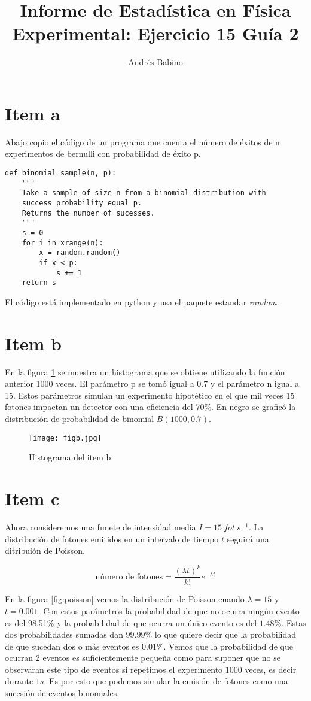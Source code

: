 \documentclass{article}
\title{Informe de Estadística en Física Experimental: Ejercicio 15 Guía 2}
\author{Andr\'es Babino}
\begin{document}
\maketitle

\section{Item a}
Abajo copio el código de un programa que cuenta el número de éxitos de n experimentos de bernulli  con probabilidad de éxito p.
\begin{lstlisting}
def binomial_sample(n, p):
    """
    Take a sample of size n from a binomial distribution with
    success probability equal p.
    Returns the number of sucesses.
    """
    s = 0
    for i in xrange(n):
        x = random.random()
        if x < p:
            s += 1
    return s
\end{lstlisting}
El código está implementado en python y usa el paquete estandar \textit{random}.

\section{Item b}
En la figura \ref{fig:itemb} se muestra un histograma que se obtiene utilizando la función anterior 1000 veces.
El parámetro p se tomó igual a 0.7 y el parámetro n igual a 15.
Estos parámetros simulan un experimento hipotético en el que mil veces 15 fotones impactan un detector con una eficiencia del 70\%.
En negro se graficó la distribución de probabilidad de binomial $B(1000, 0.7)$.

\begin{figure}
\centering
\texttt{[image: figb.jpg]}
\caption[]{Histograma del item b}
\label{fig:itemb}
\end{figure}

\section{Item c}
Ahora consideremos una funete de intensidad media $I=15\ fot\ s^{-1}$.
La distribución de fotones emitidos en un intervalo de tiempo $t$ seguirá una ditribuión de Poisson.

$$\text{número\ de\ fotones} = \frac{(\lambda t)^k}{k!} e^{-\lambda t}$$

En la figura \ref{fig:poisson} vemos la distribución de Poisson cuando $\lambda=15$ y $t=0.001$.
Con estos parámetros la probabilidad de que no ocurra ningún evento es del 98.51\% y la probabilidad de que ocurra un único evento es del $1.48\%$.
Estas dos probabilidades sumadas dan $99.99\%$  lo que quiere decir que la probabilidad de que sucedan dos o más eventos es $0.01\%$.
Vemos que la probabilidad de que ocurran 2 eventos es suficientemente pequeña como para suponer que no se observaran este tipo de eventos si repetimos el experimento $1000$ veces, es decir durante $1s$.
Es por esto que podemos simular la emisión de fotones como una sucesión de eventos binomiales.
\end{document}
